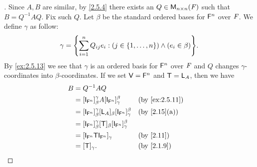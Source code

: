 \begin{proof}[]
  Since \(A, B\) are similar, by \cref{2.5.4} there exists an \(Q \in \mathsf{M}_{{n} \times n}({\mathit{F}})\) such that \(B = Q^{-1} A Q\).
  Fix such \(Q\).
  Let \(\beta\) be the standard ordered bases for \(\mathsf{F}^n\) over \(\mathit{F}\).
  We define \(\gamma\) as follow:
  \[
    \gamma = \set{\sum_{i = 1}^n Q_{i j} e_i : (j \in \set{1, \dots, n}) \land (e_i \in \beta)}.
  \]
  By \cref{ex:2.5.13} we see that \(\gamma\) is an ordered basis for \(\mathsf{F}^n\) over \(\mathit{F}\) and \(Q\) changes \(\gamma\)-coordinates into \(\beta\)-coordinates.
  If we set \(\mathsf{V} = \mathsf{F}^n\) and \(\mathsf{T} = \mathsf{L}_A\), then we have
  \begin{align*}
    B & = Q^{-1} A Q                                                                                                         \\
      & = [\IT[\vs{F}^n]]_{\beta}^{\gamma} A [\IT[\vs{F}^n]]_{\gamma}^{\beta}              &  & \text{(by \cref{ex:2.5.11})} \\
      & = [\IT[\vs{F}^n]]_{\beta}^{\gamma} [\L_A]_{\beta} [\IT[\vs{F}^n]]_{\gamma}^{\beta} &  & \text{(by \cref{2.15}(a))}   \\
      & = [\IT[\vs{F}^n]]_{\beta}^{\gamma} [\T]_{\beta} [\IT[\vs{F}^n]]_{\gamma}^{\beta}                                     \\
      & = [\IT[\vs{F}^n] \T \IT[\vs{F}^n]]_{\gamma}                                        &  & \text{(by \cref{2.11})}      \\
      & = [\T]_{\gamma}.                                                                   &  & \text{(by \cref{2.1.9})}
  \end{align*}
\end{proof}

